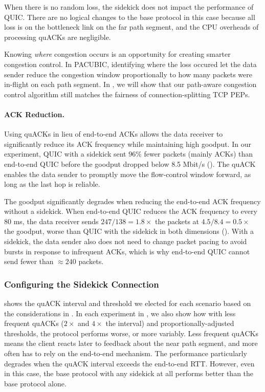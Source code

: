 When there is no random loss, the sidekick does not impact the performance
of QUIC\@.
There are no logical changes to the base protocol in this case because all loss
is on the
bottleneck link on the far path segment, and the CPU overheads of processing quACKs
are negligible.

Knowing \emph{where} congestion occurs is an opportunity for creating smarter
congestion control.
In PACUBIC, identifying where the loss occured let the data sender
reduce the congestion window proportionally to how many packets were in-flight
on each path segment.
In , we will show that our
path-aware congestion control algorithm still matches the fairness of
connection-splitting TCP PEPs.

\paragraph{ACK Reduction.}

Using quACKs in lieu of end-to-end ACKs allows the data receiver to
significantly reduce its ACK frequency while maintaining high goodput.
In our experiment, QUIC with a sidekick sent $96\%$ fewer packets (mainly ACKs)
than end-to-end QUIC before the goodput dropped below 8.5 Mbit/s
().
The quACK enables the data sender to promptly move the flow-control window forward,
as long as the last hop is reliable.

The goodput significantly degrades when reducing the end-to-end ACK frequency
without a sidekick. When end-to-end QUIC reduces the ACK frequency to every
80 ms, the data receiver sends $247 / 138 = 1.8\times$ the packets at
$4.5 / 8.4 = 0.5\times$ the goodput, worse than QUIC with the sidekick
in both dimensions (). With a sidekick,
the data sender also does not need to change packet pacing to avoid bursts in
response to infrequent ACKs, which is why end-to-end QUIC cannot send fewer
than $\approx 240$ packets.

\subsubsection{Configuring the Sidekick Connection}
 shows the quACK interval and threshold we
elected for each scenario based on the considerations in
. In each experiment in ,
we also show how with less frequent quACKs ($2\times$ and $4\times$ the
interval) and proportionally-adjusted thresholds, the protocol performs worse,
or more variably. Less frequent quACKs means the client reacts later to
feedback about the near path segment, and more often has to rely on the
end-to-end mechanism. The performance particularly degrades when the quACK
interval exceeds the end-to-end RTT. However, even in this case, the base
protocol with any sidekick at all performs better than the base protocol alone\@.

